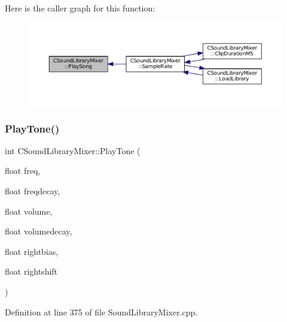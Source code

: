 Here is the caller graph for this function\+:\nopagebreak
\begin{figure}[H]
\begin{center}
\leavevmode
\includegraphics[width=350pt]{classCSoundLibraryMixer_ad8fdd1f573967a8124cd4bc4a8c29ea1_icgraph}
\end{center}
\end{figure}
\hypertarget{classCSoundLibraryMixer_a48bf99193d92c07a5c5229d58a10d9fe}{}\label{classCSoundLibraryMixer_a48bf99193d92c07a5c5229d58a10d9fe} 
\subsubsection{\texorpdfstring{Play\+Tone()}{PlayTone()}}
{\footnotesize\ttfamily int C\+Sound\+Library\+Mixer\+::\+Play\+Tone (\begin{DoxyParamCaption}\item[{float}]{freq,  }\item[{float}]{freqdecay,  }\item[{float}]{volume,  }\item[{float}]{volumedecay,  }\item[{float}]{rightbias,  }\item[{float}]{rightshift }\end{DoxyParamCaption})}



Definition at line 375 of file Sound\+Library\+Mixer.\+cpp.


